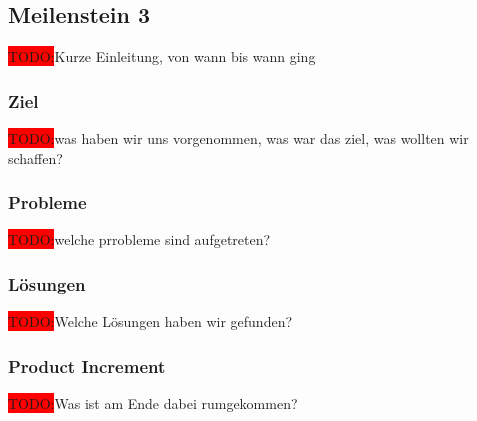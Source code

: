 \documentclass[10pt, a4paper]{article}
\begin{document}

\subsection{Meilenstein 3}
\colorbox{red}{TODO:}Kurze Einleitung,  von wann bis wann ging
\subsubsection{Ziel}
\colorbox{red}{TODO:}was haben wir uns vorgenommen, was war das ziel, was wollten wir schaffen?
\subsubsection{Probleme}
\colorbox{red}{TODO:}welche prrobleme sind aufgetreten?

\subsubsection{Lösungen}
\colorbox{red}{TODO:}Welche Lösungen haben wir gefunden?

\subsubsection{Product Increment}
\colorbox{red}{TODO:}Was ist am Ende dabei rumgekommen?
\end{document}
